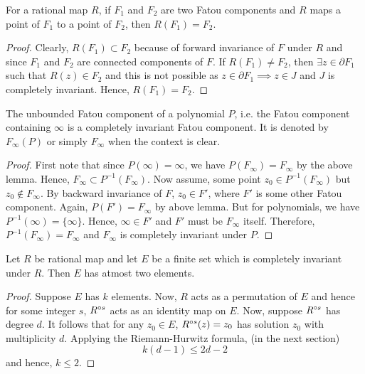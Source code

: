 \begin{lemma}\label{lem1.1}
	For a rational map \( R \), if \( F_1 \) and \( F_2 \) are two Fatou components and \( R \)
	maps a point of \( F_1 \) to a point of \( F_2 \), then \( R(F_1)=F_2 \).
\end{lemma}
\begin{proof}
Clearly, \( R(F_1)\subset F_2 \) because of forward invariance of \( F \) under \( R \) and since \( F_1 \) and \( F_2 \)
are connected components of \( F \). If \( R(F_1)\neq F_2 \), then \( \exists z \in \partial F_1 \) such that \( R(z)\in F_2 \) and
this is not possible as \( z\in \partial F_1\implies z\in J \) and \( J \) is completely invariant. Hence, \( R(F_1)=F_2 \).
\end{proof}

\begin{theorem}\label{thm1.4}
	The unbounded Fatou component of a polynomial \( P \), i.e. the Fatou component containing \( \infty \)
	is a completely invariant Fatou component. It is denoted by \( F_\infty(P) \) or simply \( F_\infty \) when
	the context is clear.
\end{theorem}
\begin{proof}
	First note that since \( P(\infty)=\infty \), we have \( P(F_\infty)=F_\infty \) by the above lemma. Hence, \( F_\infty \subset P^{-1}(F_\infty) \).
	Now assume, some point \( z_0\in P^{-1}(F_\infty) \) but \( z_0\not\in F_\infty \). By backward invariance of \( F \),  \( z_0\in F' \),
	where \( F' \) is some other Fatou component. Again, \( P(F')=F_\infty \) by above lemma. But for polynomials, we have \( P^{-1}(\infty)=\{\infty\}\). Hence, \( \infty \in F' \) and \( F' \) must be \( F_\infty \) itself. Therefore, \( P^{-1}(F_\infty)=F_\infty \) and \( F_\infty \) is completely invariant under \( P \).
\end{proof}

\begin{theorem}
	Let \( R \) be rational map and let \( E \) be a finite set which is completely invariant under \( R \). 
	Then \( E \) has atmost two elements.
\end{theorem}
\begin{proof}
	Suppose \( E \) has \( k \) elements. Now, \( R \) acts as a permutation of \( E \) and hence for some integer \( s \),
	\( \ror[s] \) acts as an identity map on \( E \). Now, suppose \( \ror[s] \) has degree \( d \). It follows that for any \( z_0\in E \),
	\( \ror[s](z)=z_0 \) has solution \( z_0 \) with multiplicity \( d \). Applying the Riemann-Hurwitz formula, (in the next section) \[
		k(d-1)\le 2d-2
	\] and hence, \( k\le 2 \).
\end{proof}


